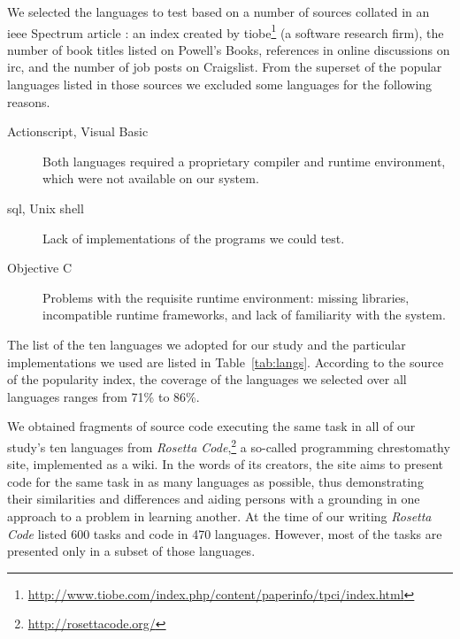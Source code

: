 \documentclass[10pt]{sigplanconf}
\begin{document}
We selected the languages to test based on a number of sources
collated in an {\sc ieee} Spectrum article \cite{Kin11}:
an index created by
{\sc tiobe}\footnote{\url{http://www.tiobe.com/index.php/content/paperinfo/tpci/index.html}} (a software research firm),
the number of book titles listed on Powell's Books,
references in online discussions on {\sc irc}, and
the number of job posts on Craigslist.
From the superset of the popular languages listed in those
sources we excluded some languages for the following reasons.
\begin{description}
\item[Actionscript, Visual Basic] Both languages
required a proprietary compiler and runtime environment,
which were not available on our system.
\item[{\sc sql}, Unix shell] Lack of implementations of the programs
we could test.
\item[Objective C] Problems with the requisite runtime environment:
missing libraries, incompatible runtime frameworks,
and lack of familiarity with the system.
\end{description}

The list of the ten languages we adopted for our study and the
particular implementations we used are listed in
Table~\ref{tab:langs}.
According to the source of the popularity index,
the coverage of the languages we selected over all languages
ranges from 71\% to 86\%.

We obtained fragments of source code executing the same task in all of
our study's ten languages from
{\em Rosetta Code},\footnote{\url{http://rosettacode.org/}}
a so-called programming chrestomathy site,
implemented as a wiki.
In the words of its creators,
the site aims to present code for the same task in as many languages as possible,
thus demonstrating their similarities and differences and
aiding persons with a grounding in one approach to a problem in learning another.
At the time of our writing {\em Rosetta Code}
listed 600 tasks and code in 470 languages.
However, most of the tasks are presented only in a subset of those languages.
\end{document}
